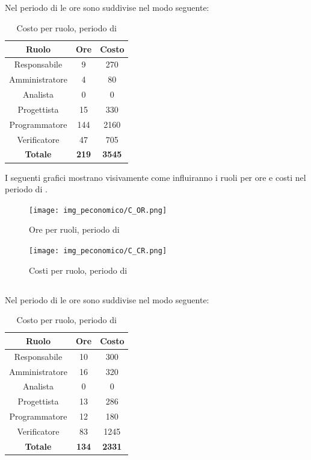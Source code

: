 \subsection{\Cod}
Nel periodo di \Cod{} le ore sono suddivise nel modo seguente:
\begin{table}[H]
	\centering
	\begin{tabular}{|c|c|c|}
		\hline
		\textbf{Ruolo} &
		\textbf{Ore} &
		\textbf{Costo} \\
		\hline
		Responsabile & 9 & 270 \\
		\hline
		Amministratore & 4 & 80 \\
		\hline
		Analista & 0 & 0\\
		\hline
		Progettista & 15 & 330 \\
		\hline
		Programmatore & 144 & 2160 \\
		\hline
		Verificatore & 47 & 705 \\
		\hline
		\textbf{Totale} & \textbf{219} & \textbf{3545} \\
		\hline
	\end{tabular}
	\caption{Costo per ruolo, periodo di \Cod}
\end{table}

I seguenti grafici mostrano visivamente come influiranno i ruoli per ore e costi nel periodo di \Cod.
\begin{figure}[H]
	\centering
	\texttt{[image: img\_peconomico/C\_OR.png]}
	\caption{Ore per ruoli, periodo di \Cod}
\end{figure}
\begin{figure}[H]
	\centering
	\texttt{[image: img\_peconomico/C\_CR.png]}
	\caption{Costi per ruolo, periodo di \Cod}
\end{figure}

\subsection{\VV}
Nel periodo di \VV{} le ore sono suddivise nel modo seguente:
\begin{table}[H]
	\centering
	\begin{tabular}{|c|c|c|}
		\hline
		\textbf{Ruolo} &
		\textbf{Ore} &
		\textbf{Costo} \\
		\hline
		Responsabile & 10 & 300\\
		\hline
		Amministratore & 16 & 320\\
		\hline
		Analista & 0 & 0\\
		\hline
		Progettista & 13 & 286 \\
		\hline
		Programmatore & 12 & 180 \\
		\hline
		Verificatore & 83 & 1245\\
		\hline
		\textbf{Totale} & \textbf{134} & \textbf{2331} \\
		\hline
	\end{tabular}
	\caption{Costo per ruolo, periodo di \VV}
\end{table}

